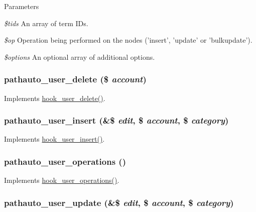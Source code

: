 \begin{DoxyParams}{Parameters}
\item[{\em \$tids}]An array of term IDs. \item[{\em \$op}]Operation being performed on the nodes ('insert', 'update' or 'bulkupdate'). \item[{\em \$options}]An optional array of additional options. \end{DoxyParams}
\hypertarget{pathauto_8module_a2ab8bcc3e1528ae3088dc9fef8ef55e8}{
\subsubsection[{pathauto\_\-user\_\-delete}]{\setlength{\rightskip}{0pt plus 5cm}pathauto\_\-user\_\-delete (\$ {\em account})}}
\label{pathauto_8module_a2ab8bcc3e1528ae3088dc9fef8ef55e8}
Implements \hyperlink{group__hooks_ga2c0755857e486e8a770b44b496da9929}{hook\_\-user\_\-delete()}. \hypertarget{pathauto_8module_afc367a3a7a9e84f3704b8baf5f3d73bc}{
\subsubsection[{pathauto\_\-user\_\-insert}]{\setlength{\rightskip}{0pt plus 5cm}pathauto\_\-user\_\-insert (\&\$ {\em edit}, \/  \$ {\em account}, \/  \$ {\em category})}}
\label{pathauto_8module_afc367a3a7a9e84f3704b8baf5f3d73bc}
Implements \hyperlink{group__hooks_gaa3e2c4c972ee796d216b15da7aaf9c2c}{hook\_\-user\_\-insert()}. \hypertarget{pathauto_8module_a0f247e28488c4fe7f4306c14add7a565}{
\subsubsection[{pathauto\_\-user\_\-operations}]{\setlength{\rightskip}{0pt plus 5cm}pathauto\_\-user\_\-operations ()}}
\label{pathauto_8module_a0f247e28488c4fe7f4306c14add7a565}
Implements \hyperlink{group__hooks_ga1b2c2630f79b64b0673d0a9a0983f447}{hook\_\-user\_\-operations()}. \hypertarget{pathauto_8module_ac2569a0defd03ecce4977acb75c6db3e}{
\subsubsection[{pathauto\_\-user\_\-update}]{\setlength{\rightskip}{0pt plus 5cm}pathauto\_\-user\_\-update (\&\$ {\em edit}, \/  \$ {\em account}, \/  \$ {\em category})}}
